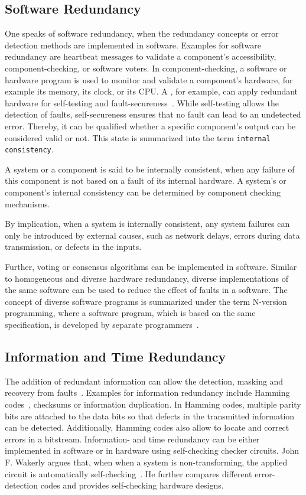 \subsection{Software Redundancy}
One speaks of software redundancy, when the redundancy concepts or error detection methods are implemented in software.
Examples for software redundancy are heartbeat messages to validate a component's accessibility, component-checking, or software voters.
In component-checking, a software or hardware program is used to monitor and validate a component's hardware, for example its memory, its clock, or its \gls*{CPU}.
A , for example, can apply redundant hardware for self-testing and fault-secureness~\cite{SelfCheckingProcessorDesign}.
While self-testing allows the detection of faults, self-secureness ensures that no fault can lead to an undetected error.
Thereby, it can be qualified whether a specific component's output can be considered valid or not.
This state is summarized into the term \texttt{internal consistency}.

\begin{definition}
A system or a component is said to be internally consistent, when any failure of this component is not based on a fault of its internal hardware.
A system's or component's internal consistency can be determined by component checking mechanisms.
\end{definition}

By implication, when a system is internally consistent, any system failures can only be introduced by external causes, such as network delays, errors during data transmission, or defects in the inputs.

Further, voting or consensus algorithms can be implemented in software.
Similar to homogeneous and diverse hardware redundancy, diverse implementations of the same software can be used to reduce the effect of faults in a software.
The concept of diverse software programs is summarized under the term N-version programming, where a software program, which is based on the same specification, is developed by separate programmers~\cite{BarryFaultToleranceAnalysis}.

\subsection{Information and Time Redundancy}
The addition of redundant information can allow the detection, masking and recovery from faults~\cite{BarryFaultToleranceAnalysis}.
Examples for information redundancy include Hamming codes~\cite{HammingCodes}, checksums or information duplication.
In Hamming codes, multiple parity bits are attached to the data bits so that defects in the transmitted information can be detected.
Additionally, Hamming codes also allow to locate and correct errors in a bitstream.
Information- and time redundancy can be either implemented in software or in hardware using self-checking checker circuits.
John F. Wakerly argues that, when when a system is non-transforming, the applied circuit is automatically self-checking~\cite{SelfCheckingProcessorDesign}.
He further compares different error-detection codes and provides self-checking hardware designs.


